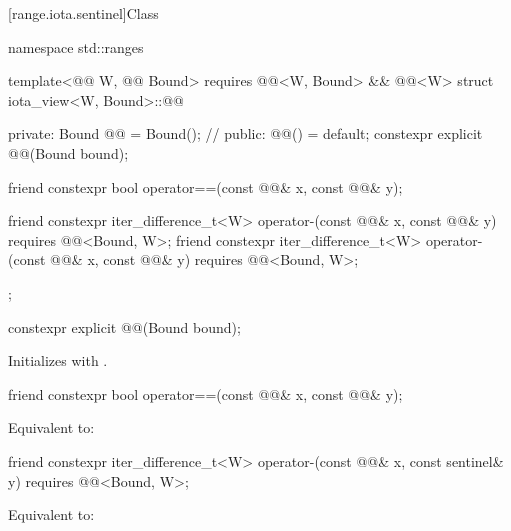 [range.iota.sentinel]{Class }

%
\begin{codeblock}
namespace std::ranges {
  template<@@ W, @@ Bound>
    requires @@<W, Bound> && @@<W>
  struct iota_view<W, Bound>::@@ {
  private:
    Bound @@ = Bound();     // \expos
  public:
    @@() = default;
    constexpr explicit @@(Bound bound);

    friend constexpr bool operator==(const @@& x, const @@& y);

    friend constexpr iter_difference_t<W> operator-(const @@& x, const @@& y)
      requires @@<Bound, W>;
    friend constexpr iter_difference_t<W> operator-(const @@& x, const @@& y)
      requires @@<Bound, W>;
  };
}
\end{codeblock}

\begin{itemdecl}
constexpr explicit @@(Bound bound);
\end{itemdecl}

\begin{itemdescr}
\pnum
\effects
Initializes  with .
\end{itemdescr}

\begin{itemdecl}
friend constexpr bool operator==(const @@& x, const @@& y);
\end{itemdecl}

\begin{itemdescr}
\pnum
\effects
Equivalent to: 
\end{itemdescr}

\begin{itemdecl}
friend constexpr iter_difference_t<W> operator-(const @@& x, const sentinel& y)
  requires @@<Bound, W>;
\end{itemdecl}

\begin{itemdescr}
\pnum
\effects
Equivalent to: 
\end{itemdescr}

